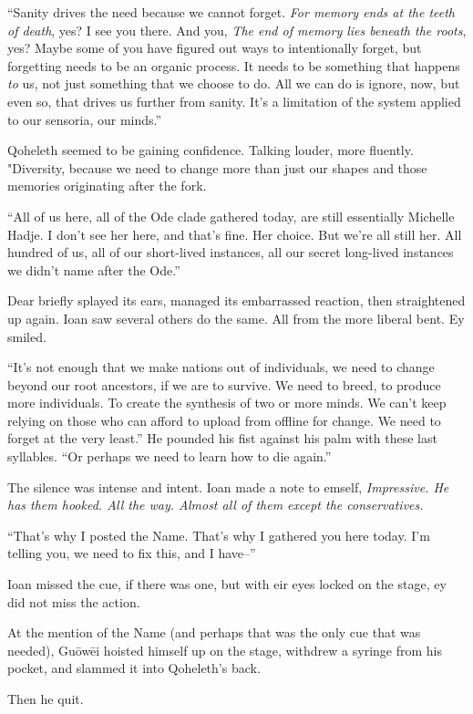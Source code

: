 ``Sanity drives the need because we cannot forget. \emph{For memory ends at the teeth of death}, yes? I see you there. And you, \emph{The end of memory lies beneath the roots}, yes? Maybe some of you have figured out ways to intentionally forget, but forgetting needs to be an organic process. It needs to be something that happens \emph{to} us, not just something that we choose to do. All we can do is ignore, now, but even so, that drives us further from sanity. It's a limitation of the system applied to our sensoria, our minds.''

Qoheleth seemed to be gaining confidence. Talking louder, more fluently. "Diversity, because we need to change more than just our shapes and those memories originating after the fork.

``All of us here, all of the Ode clade gathered today, are still essentially Michelle Hadje. I don't see her here, and that's fine. Her choice. But we're all still her. All hundred of us, all of our short-lived instances, all our secret long-lived instances we didn't name after the Ode.''

Dear briefly splayed its ears, managed its embarrassed reaction, then straightened up again. Ioan saw several others do the same. All from the more liberal bent. Ey smiled.

``It's not enough that we make nations out of individuals, we need to change beyond our root ancestors, if we are to survive. We need to breed, to produce more individuals. To create the synthesis of two or more minds. We can't keep relying on those who can afford to upload from offline for change. We need to forget at the very least.'' He pounded his fist against his palm with these last syllables. ``Or perhaps we need to learn how to die again.''

The silence was intense and intent. Ioan made a note to emself, \emph{Impressive. He has them hooked. All the way. Almost all of them except the conservatives.}

``That's why I posted the Name. That's why I gathered you here today. I'm telling you, we need to fix this, and I have--''

Ioan missed the cue, if there was one, but with eir eyes locked on the stage, ey did not miss the action.

At the mention of the Name (and perhaps that was the only cue that was needed), Guōwēi hoisted himself up on the stage, withdrew a syringe from his pocket, and slammed it into Qoheleth's back.

Then he quit.

